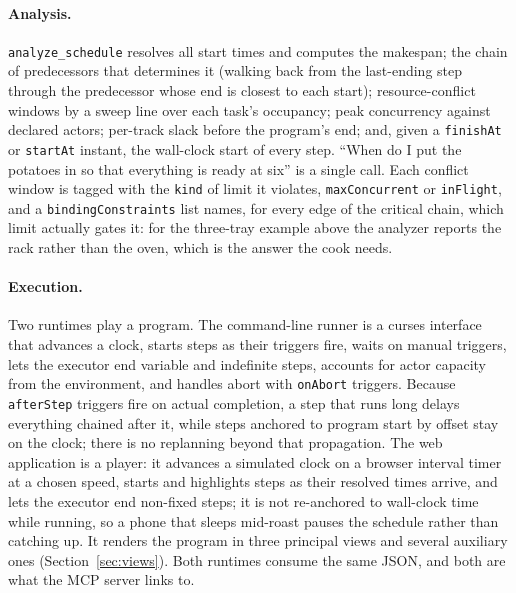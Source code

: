 \documentclass[10pt]{article}
\newcommand{\code}[1]{\texttt{#1}}
\begin{document}
\paragraph{Analysis.} \code{analyze\_schedule} resolves all start times and computes the makespan; the chain of predecessors that determines it (walking back from the last-ending step through the predecessor whose end is closest to each start); resource-conflict windows by a sweep line over each task's occupancy; peak concurrency against declared actors; per-track slack before the program's end; and, given a \code{finishAt} or \code{startAt} instant, the wall-clock start of every step. ``When do I put the potatoes in so that everything is ready at six'' is a single call. Each conflict window is tagged with the \code{kind} of limit it violates, \code{maxConcurrent} or \code{inFlight}, and a \code{bindingConstraints} list names, for every edge of the critical chain, which limit actually gates it: for the three-tray example above the analyzer reports the rack rather than the oven, which is the answer the cook needs.

\paragraph{Execution.} Two runtimes play a program. The command-line runner is a curses interface that advances a clock, starts steps as their triggers fire, waits on manual triggers, lets the executor end variable and indefinite steps, accounts for actor capacity from the environment, and handles abort with \code{onAbort} triggers. Because \code{afterStep} triggers fire on actual completion, a step that runs long delays everything chained after it, while steps anchored to program start by offset stay on the clock; there is no replanning beyond that propagation. The web application is a player: it advances a simulated clock on a browser interval timer at a chosen speed, starts and highlights steps as their resolved times arrive, and lets the executor end non-fixed steps; it is not re-anchored to wall-clock time while running, so a phone that sleeps mid-roast pauses the schedule rather than catching up. It renders the program in three principal views and several auxiliary ones (Section~\ref{sec:views}). Both runtimes consume the same JSON, and both are what the MCP server links to.
\end{document}
